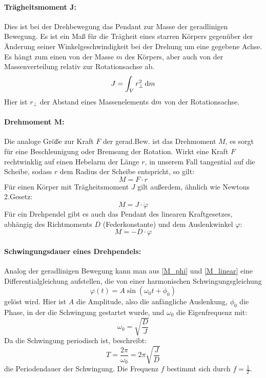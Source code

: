 \paragraph{Trägheitsmoment \(\boldsymbol{J}\):}
Dies ist bei der Drehbewegung das Pendant zur Masse der geradlinigen Bewegung. Es ist ein Maß für die Trägheit eines starren Körpers gegenüber der Änderung seiner Winkelgeschwindigkeit bei der Drehung um eine gegebene Achse. Es hängt zum einen von der Masse \(m\) des Körpers, aber auch von der Massenverteilung relativ zur Rotationsachse ab. 
\begin{equation}
    J=\int_V r_{\perp}^2\mathop{}\!\mathrm{d} m
    \label{J}
\end{equation}
Hier ist \(r_{\perp}\) der Abstand eines Massenelements \(\mathop{}\!\mathrm{d} m\) von der Rotationsachse. 

\paragraph{Drehmoment \(\boldsymbol{M}\):}
Die analoge Größe zur Kraft \(F\) der gerad.Bew. ist das Drehmoment \(M\), es sorgt für eine Beschleunigung oder Bremsung der Rotation. Wirkt eine Kraft \(F\) rechtwinklig auf einen Hebelarm der Länge \(r\), in unserem Fall tangential auf die Scheibe, sodass \(r\) dem Radius der Scheibe entspricht, so gilt:
\begin{equation}
    M=F\cdot r 
    \label{M}
\end{equation} 
Für einen Körper mit Trägheitsmoment \(J\) gilt außerdem, ähnlich wie Newtons 2.Gesetz:
\begin{equation}
    M=J\cdot \ddot{\varphi} 
    \label{M_phi}
\end{equation}
Für ein Drehpendel gibt es auch das Pendant des linearen Kraftgesetzes, abhängig des Richtmoments \(D\) (\glqq Federkonstante\grqq) und dem Auslenkwinkel \(\varphi\):
\begin{equation}
    M=-D\cdot \varphi
    \label{M_linear}
\end{equation}

\paragraph{Schwingungsdauer eines Drehpendels:}
Analog der geradlinigen Bewegung kann man aus \cref{M_phi} und \cref{M_linear} eine Differentialgleichung aufstellen, die von einer harmonischen Schwingungsgleichung \[\varphi(t)=A\sin(\omega_0t+\phi_0)\] gelöst wird. Hier ist \(A\) die Amplitude, also die anfängliche Auslenkung, \(\phi_0\) die Phase, in der die Schwingung gestartet wurde, und \(\omega_0\) die Eigenfrequenz mit:
\begin{equation}
    \omega_0=\sqrt{\frac{D}{J}}
    \label{omega_0}
\end{equation}
Da die Schwingung periodisch ist, beschreibt:
\begin{equation}
    T=\frac{2\pi}{\omega_0}=2\pi\sqrt{\frac{J}{D}}
\end{equation}
die Periodendauer der Schwingung. Die Frequenz \(f\) bestimmt sich durch \(f=\frac{1}{T}\).

